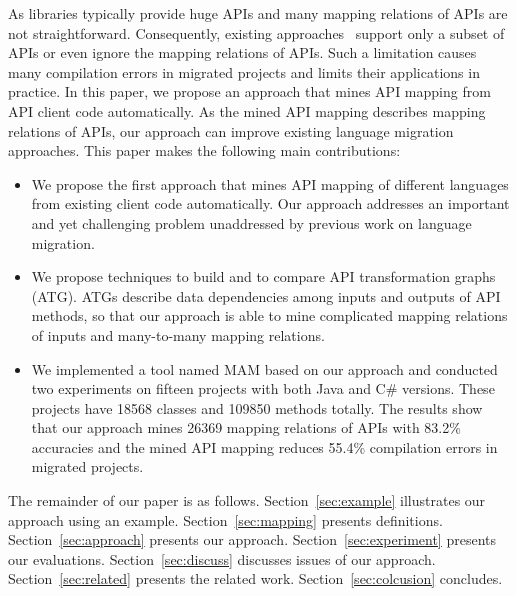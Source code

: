 As libraries typically provide huge APIs and many mapping relations
of APIs are not straightforward. Consequently, existing
approaches~\cite{mossienko2003automated,yasumatsu1995spice,hainaut2008migration}
support only a subset of APIs or even ignore the mapping relations
of APIs. Such a limitation causes many compilation errors in
migrated projects and limits their applications in practice. In this
paper, we propose an approach that mines API mapping from API client
code automatically. As the mined API mapping describes mapping
relations of APIs, our approach can improve existing language
migration approaches. This paper makes the following main
contributions:

\begin{itemize}\vspace*{-1.5ex}
\item We propose the first approach that mines API mapping of
different languages from existing client code automatically. Our
approach addresses an important and yet challenging problem
unaddressed by previous work on language migration.\vspace*{-1.5ex}
\item We propose techniques to build and to compare API
transformation graphs (ATG). ATGs describe data dependencies among
inputs and outputs of API methods, so that our approach is able to
mine complicated mapping relations of inputs and many-to-many
mapping relations.\vspace*{-1.5ex}
\item We
implemented a tool named MAM based on our approach and conducted two
experiments on fifteen projects with both Java and C\# versions.
These projects have 18568 classes and 109850 methods totally. The
results show that our approach mines 26369 mapping relations of APIs
with 83.2\% accuracies and the mined API mapping reduces 55.4\%
compilation errors in migrated projects.
\end{itemize}\vspace*{-1.5ex}


The remainder of our paper is as follows. Section~\ref{sec:example}
illustrates our approach using an example. Section~\ref{sec:mapping}
presents definitions. Section~\ref{sec:approach} presents our
approach. Section~\ref{sec:experiment} presents our evaluations.
Section~\ref{sec:discuss} discusses issues of our approach.
Section~\ref{sec:related} presents the related work.
Section~\ref{sec:colcusion} concludes.
